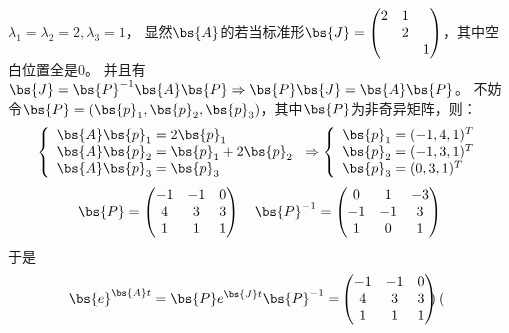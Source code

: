 \documentclass[12pt, a4paper, oneside, UTF8]{ctexbook}
\begin{document}
\begin{solution}
    $\lambda_1=\lambda_2=2,\lambda_3=1$，
    显然$\bs{A}$的若当标准形$\bs{J}=\begin{pmatrix}
        2 &1 & \\
         & 2 & \\
         & & 1
    \end{pmatrix}$，其中空白位置全是$0$。
    并且有$\bs{J}=\bs{P}^{-1}\bs{A}\bs{P} \Rightarrow \bs{P}\bs{J}=\bs{A}\bs{P}$。
    不妨令$\bs{P}=(\bs{p}_1,\bs{p}_2,\bs{p}_3)$，其中$\bs{P}$为非奇异矩阵，则：
    \begin{align*}
        \left\{
            \begin{array}{ll}
                \bs{A}\bs{p}_1=2\bs{p}_1 \\
                \bs{A}\bs{p}_2=\bs{p}_1+2\bs{p}_2 \\
                \bs{A}\bs{p}_3=\bs{p}_3
            \end{array} 
            \right.
            \Rightarrow
            \left\{
            \begin{array}{ll}
                \bs{p}_1=(-1,4,1)^T \\
                \bs{p}_2=(-1,3,1)^T \\
                \bs{p}_3=(0,3,1)^T
            \end{array} 
            \right.
    \end{align*}
    \begin{align*}
        \bs{P}=\begin{pmatrix}
            -1 & -1 &0 \\
            4 & 3 &3 \\
            1 & 1 & 1
        \end{pmatrix} \quad
        \bs{P}^{-1}=\begin{pmatrix}
            0 & 1 &-3 \\
            -1 & -1 &3 \\
            1 & 0 & 1        
        \end{pmatrix}
    \end{align*}
    于是
    \begin{align*}
    \bs{e}^{\bs{A}t}=\bs{P}e^{\bs{J}t}\bs{P}^{-1}
    =&\begin{pmatrix}
        -1 & -1 &0 \\
        4 & 3 &3 \\
        1 & 1 & 1
    \end{pmatrix}\begin{pmatrix}

\end{pmatrix}
\end{align*}
\end{solution}
\end{document}
